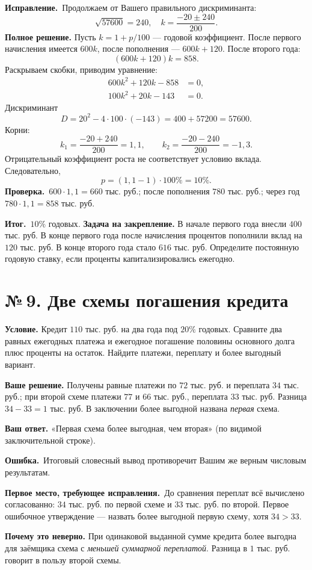 \documentclass[a4paper,12pt]{article}
\newcommand{\errlabel}{\textcolor{err}{\textbf{Ошибка.}}}
\newcommand{\resultlabel}{\textcolor{accent}{\textbf{Итог.}}}
\newcommand{\reviewtask}[2]{\clearpage\phantomsection\label{task:#1}\section*{\textcolor{accent}{№\,#1. #2}}}
\newcommand{\firstwrong}{\textbf{Первое место, требующее исправления.}}
\newcommand{\fix}{\textbf{Исправление.}}
\newcommand{\verify}{\textbf{Проверка.}}
\newcommand{\practice}{\medskip\textbf{Задача на закрепление.} }
\begin{document}
\fix\ Продолжаем от Вашего правильного дискриминанта:
\[
\sqrt{57600}=240,
\quad k=\frac{-20\pm240}{200}.
\]
\textbf{Полное решение.} Пусть $k=1+p/100$ --- годовой коэффициент. После первого начисления имеется $600k$, после пополнения --- $600k+120$. После второго года:
\[
(600k+120)k=858.
\]
Раскрываем скобки, приводим уравнение:
\begin{align*}
600k^2+120k-858&=0,\\
100k^2+20k-143&=0.
\end{align*}
Дискриминант
\[
D=20^2-4\cdot100\cdot(-143)=400+57200=57600.
\]
Корни:
\[
k_1=\frac{-20+240}{200}=1{,}1,
\qquad k_2=\frac{-20-240}{200}=-1{,}3.
\]
Отрицательный коэффициент роста не соответствует условию вклада. Следовательно,
\[
p=(1{,}1-1)\cdot100\%=10\%.
\]
\verify\ $600\cdot1{,}1=660$ тыс. руб.; после пополнения $780$ тыс. руб.; через год $780\cdot1{,}1=858$ тыс. руб.

\resultlabel\ $\boxed{10\%\text{ годовых}}$.
\practice В начале первого года внесли $400$ тыс. руб. В конце первого года после начисления процентов пополнили вклад на $120$ тыс. руб. В конце второго года стало $616$ тыс. руб. Определите постоянную годовую ставку, если проценты капитализировались ежегодно.

\reviewtask{9}{Две схемы погашения кредита}
\textbf{Условие.} Кредит $110$ тыс. руб. на два года под $20\%$ годовых. Сравните два равных ежегодных платежа и ежегодное погашение половины основного долга плюс проценты на остаток. Найдите платежи, переплату и более выгодный вариант.

\textbf{Ваше решение.} Получены равные платежи по $72$ тыс. руб. и переплата $34$ тыс. руб.; при второй схеме платежи $77$ и $66$ тыс. руб., переплата $33$ тыс. руб. Разница $34-33=1$ тыс. руб. В заключении более выгодной названа \emph{первая} схема.

\textbf{Ваш ответ.} «Первая схема более выгодная, чем вторая» (по видимой заключительной строке).

\errlabel\ Итоговый словесный вывод противоречит Вашим же верным числовым результатам.

\firstwrong\ До сравнения переплат всё вычислено согласованно: $34$ тыс. руб. по первой схеме и $33$ тыс. руб. по второй. Первое ошибочное утверждение --- назвать более выгодной первую схему, хотя $34>33$.

\textbf{Почему это неверно.} При одинаковой выданной сумме кредита более выгодна для заёмщика схема с \emph{меньшей суммарной переплатой}. Разница в $1$ тыс. руб. говорит в пользу второй схемы.
\end{document}
